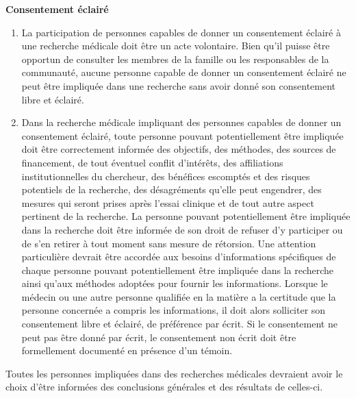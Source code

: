 \documentclass[
  12pt,
]{book}
\begin{document}
\textbf{Consentement éclairé}

\begin{enumerate}
\def\labelenumi{\arabic{enumi}.}
\setcounter{enumi}{24}
\item
  La participation de personnes capables de donner un consentement éclairé à une recherche médicale doit être un acte volontaire. Bien qu'il puisse être opportun de consulter les membres de la famille ou les responsables de la communauté, aucune personne capable de donner un consentement éclairé ne peut être impliquée dans une recherche sans avoir donné son consentement libre et éclairé.
\item
  Dans la recherche médicale impliquant des personnes capables de donner un consentement éclairé, toute personne pouvant potentiellement être impliquée doit être correctement informée des objectifs, des méthodes, des sources de financement, de tout éventuel conflit d'intérêts, des affiliations institutionnelles du chercheur, des bénéfices escomptés et des risques potentiels de la recherche, des désagréments qu'elle peut engendrer, des mesures qui seront prises après l'essai clinique et de tout autre aspect pertinent de la recherche. La personne pouvant potentiellement être impliquée dans la recherche doit être informée de son droit de refuser d'y participer ou de s'en retirer à tout moment sans mesure de rétorsion. Une attention particulière devrait être accordée aux besoins d'informations spécifiques de chaque personne pouvant potentiellement être impliquée dans la recherche ainsi qu'aux méthodes adoptées pour fournir les informations. Lorsque le médecin ou une autre personne qualifiée en la matière a la certitude que la personne concernée a compris les informations, il doit alors solliciter son consentement libre et éclairé, de préférence par écrit. Si le consentement ne peut pas être donné par écrit, le consentement non écrit doit être formellement documenté en présence d'un témoin.
\end{enumerate}

Toutes les personnes impliquées dans des recherches médicales devraient avoir le choix d'être informées des conclusions générales et des résultats de celles-ci.
\end{document}
